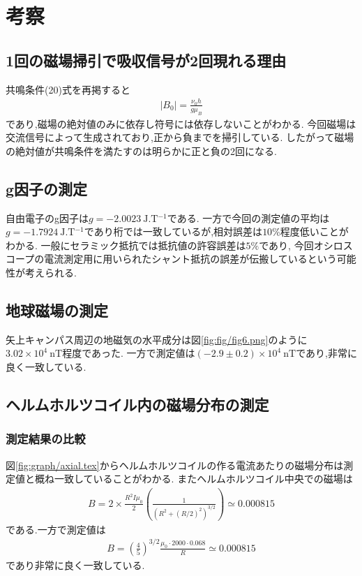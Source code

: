 \section{考察}
\subsection{1回の磁場掃引で吸収信号が2回現れる理由}
共鳴条件(20)式を再掲すると
\begin{align}
  |B_0|=\frac{\nu_0 h}{g\mu_B}
\end{align}
であり,磁場の絶対値のみに依存し符号には依存しないことがわかる.
今回磁場は交流信号によって生成されており,正から負までを掃引している.
したがって磁場の絶対値が共鳴条件を満たすのは明らかに正と負の2回になる.
\subsection{g因子の測定}
自由電子のg因子は$g=-2.0023\ \si{\joule.\tesla^{-1}}$である.\cite{rika}
一方で今回の測定値の平均は$g=-1.7924\ \si{\joule.\tesla^{-1}}$であり桁では一致しているが,相対誤差は$10\%$程度低いことがわかる.
一般にセラミック抵抗では抵抗値の許容誤差は$5\%$であり,
今回オシロスコープの電流測定用に用いられたシャント抵抗の誤差が伝搬しているという可能性が考えられる.
\subsection{地球磁場の測定}
矢上キャンパス周辺の地磁気の水平成分は図\ref{fig:fig/fig6.png}のように$3.02\times10^4\ \si{\nano\tesla}$程度であった.\cite{tijiki}
一方で測定値は$(-2.9\pm0.2)\times10^4\ \si{\nano\tesla}$であり,非常に良く一致している.
\subsection{ヘルムホルツコイル内の磁場分布の測定}
\subsubsection{測定結果の比較}
図\ref{fig:graph/axial.tex}からヘルムホルツコイルの作る電流あたりの磁場分布は測定値と概ね一致していることがわかる.
またヘルムホルツコイル中央での磁場は
\begin{align}
  B=2\times\frac{R^2I\mu_0}{2}\left(\frac{1}{(R^2+(R/2)^2)^{3/2}}\right)\simeq0.000815
\end{align}
である.一方で測定値は
\begin{align}
  B=\left(\frac{4}{5}\right)^{3/2}\frac{\mu_0\cdot2000\cdot0.068}{R}\simeq0.000815
\end{align}
であり非常に良く一致している.

